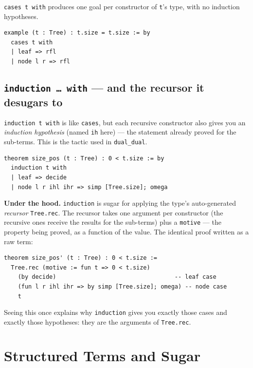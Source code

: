 \documentclass[11pt, a4paper, oneside]{book}
\newcommand{\lc}[1]{\texttt{#1}}
\begin{document}
\lc{cases t with} produces one goal per constructor of \lc{t}'s type, with no
induction hypotheses.

\begin{leanbox}
\begin{verbatim}
example (t : Tree) : t.size = t.size := by
  cases t with
  | leaf => rfl
  | node l r => rfl
\end{verbatim}
\end{leanbox}

\subsection*{\lc{induction … with} --- and the recursor it desugars to}

\lc{induction t with} is like \lc{cases}, but each recursive constructor also
gives you an \emph{induction hypothesis} (named \lc{ih} here) --- the statement
already proved for the sub-terms. This is the tactic used in \lc{dual\_dual}.

\begin{leanbox}
\begin{verbatim}
theorem size_pos (t : Tree) : 0 < t.size := by
  induction t with
  | leaf => decide
  | node l r ihl ihr => simp [Tree.size]; omega
\end{verbatim}
\end{leanbox}

\noindent\textbf{Under the hood.} \lc{induction} is sugar for applying the
type's auto-generated \emph{recursor} \lc{Tree.rec}. The recursor takes one
argument per constructor (the recursive ones receive the results for the
sub-terms) plus a \lc{motive} --- the property being proved, as a function of
the value. The identical proof written as a raw term:

\begin{leanbox}
\begin{verbatim}
theorem size_pos' (t : Tree) : 0 < t.size :=
  Tree.rec (motive := fun t => 0 < t.size)
    (by decide)                                  -- leaf case
    (fun l r ihl ihr => by simp [Tree.size]; omega) -- node case
    t
\end{verbatim}
\end{leanbox}

Seeing this once explains why \lc{induction} gives you exactly those cases and
exactly those hypotheses: they are the arguments of \lc{Tree.rec}.

\section*{Structured Terms and Sugar}
\end{document}

